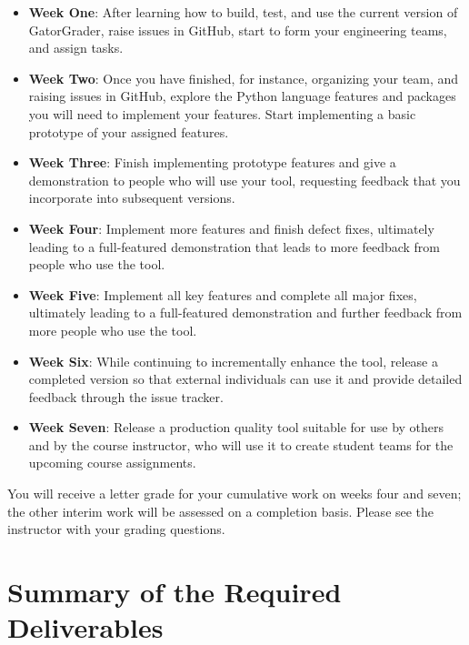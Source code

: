 \documentclass[11pt]{article}
\begin{document}
\begin{itemize}

  \setlength{\itemsep}{0pt}

  \item {\bf Week One}: After learning how to build, test, and use the current
    version of GatorGrader, raise issues in GitHub, start to form your
    engineering teams, and assign tasks.

  \item {\bf Week Two}: Once you have finished, for instance, organizing your
    team, and raising issues in GitHub, explore the Python language features and
    packages you will need to implement your features. Start implementing a
    basic prototype of your assigned features.

  \item {\bf Week Three}: Finish implementing prototype features and give a
    demonstration to people who will use your tool, requesting feedback that you
    incorporate into subsequent versions.

  \item {\bf Week Four}: Implement more features and finish defect fixes,
    ultimately leading to a full-featured demonstration that leads to more
    feedback from people who use the tool.

  \item {\bf Week Five}: Implement all key features and complete all major
    fixes, ultimately leading to a full-featured demonstration and further
    feedback from more people who use the tool.

  \item {\bf Week Six}: While continuing to incrementally enhance the tool,
    release a completed version so that external individuals can use it and
    provide detailed feedback through the issue tracker.

  \item {\bf Week Seven}: Release a production quality tool suitable for use by
    others and by the course instructor, who will use it to create student teams
    for the upcoming course assignments.

\end{itemize}

\noindent You will receive a letter grade for your cumulative work on weeks four
and seven; the other interim work will be assessed on a completion basis. Please
see the instructor with your grading questions.

\section*{Summary of the Required Deliverables}
\end{document}

